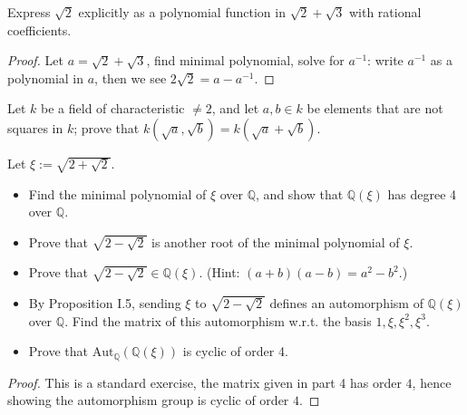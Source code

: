 \documentclass[openany]{book}
\begin{document}
\begin{prob}
Express \( \sqrt{2} \) explicitly as a polynomial function in \( \sqrt{2} + \sqrt{3} \) with rational coefficients.
\end{prob}
\begin{proof}
    Let $a=\sqrt{2} + \sqrt{3}$, find minimal polynomial, solve for $a^{-1}$: write $a^{-1}$ as a polynomial in $a$, then we see $2\sqrt{2}=a-a^{-1}$.
\end{proof}

\begin{prop}
Let \( k \) be a field of characteristic \( \neq 2 \), and let \( a, b \in k \) be elements that are not squares in \( k \); prove that \( k(\sqrt{a}, \sqrt{b}) = k(\sqrt{a} + \sqrt{b}) \).
\end{prop}

\begin{prob}
Let \( \xi := \sqrt{2 + \sqrt{2}} \).
\begin{itemize}
    \item Find the minimal polynomial of \( \xi \) over \( \mathbb{Q} \), and show that \( \mathbb{Q}(\xi) \) has degree 4 over \( \mathbb{Q} \).
    \item Prove that \( \sqrt{2 - \sqrt{2}} \) is another root of the minimal polynomial of \( \xi \).
    \item Prove that \( \sqrt{2 - \sqrt{2}} \in \mathbb{Q}(\xi) \). (Hint: \( (a + b)(a - b) = a^2 - b^2 \).)
    \item By Proposition I.5, sending \( \xi \) to \( \sqrt{2 - \sqrt{2}} \) defines an automorphism of \( \mathbb{Q}(\xi) \) over \( \mathbb{Q} \). Find the matrix of this automorphism w.r.t. the basis \( 1, \xi, \xi^2, \xi^3 \).
    \item Prove that \( \text{Aut}_{\mathbb{Q}}(\mathbb{Q}(\xi)) \) is cyclic of order 4.
\end{itemize}
\end{prob}
\begin{proof}
    This is a standard exercise, the matrix given in part 4 has order $4$, hence showing the automorphism group is cyclic of order $4$.
\end{proof}
\end{document}
